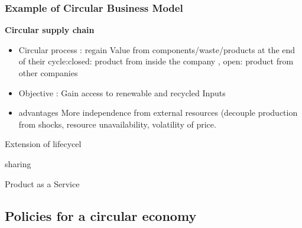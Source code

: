 \subsubsection{Example of Circular Business Model}
\begin{enumarate }
\item \textbf{Circular supply chain }
\begin{itemize}
\item Circular process : regain Value from components/waste/products at
the end of their cycle:closed: product from inside the
company , open: product from other companies
\item Objective : Gain access to renewable and recycled
Inputs
\item advantages
More independence from external
resources (decouple production from
shocks, resource unavailability,
volatility of price.
\end{itemize}
\item  Extension of lifecycel
\item sharing 
\item Product as a Service
\end{enumarate }

\subsection{Policies for a circular economy}


